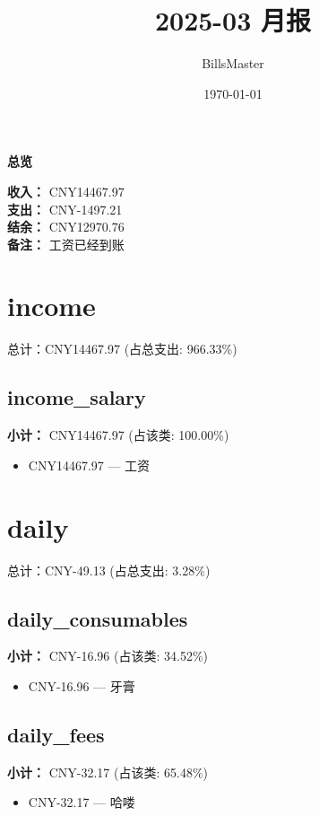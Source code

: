 \documentclass[12pt]{article}
\title{2025-03 月报}
\author{BillsMaster}
\date{\today}
\begin{document}
\maketitle

\vspace{1em}
\hrulefill
\begin{center}
    {\Large\bfseries 总览}\par\vspace{1em}
    {\large
    \textbf{收入：} CNY14467.97\\
    \textbf{支出：} CNY-1497.21\\
    \textbf{结余：} CNY12970.76\\
    \textbf{备注：} 工资已经到账
    }
\end{center}
\hrulefill

\section*{income}
总计：CNY14467.97 	 (占总支出: 966.33\%)

\subsection*{income\_salary}
\textbf{小计：} CNY14467.97 (占该类: 100.00\%)
\begin{itemize}
    \item CNY14467.97 --- 工资
\end{itemize}
\section*{daily}
总计：CNY-49.13 	 (占总支出: 3.28\%)

\subsection*{daily\_consumables}
\textbf{小计：} CNY-16.96 (占该类: 34.52\%)
\begin{itemize}
    \item CNY-16.96 --- 牙膏
\end{itemize}
\subsection*{daily\_fees}
\textbf{小计：} CNY-32.17 (占该类: 65.48\%)
\begin{itemize}
    \item CNY-32.17 --- 哈喽
\end{itemize}
\end{document}

